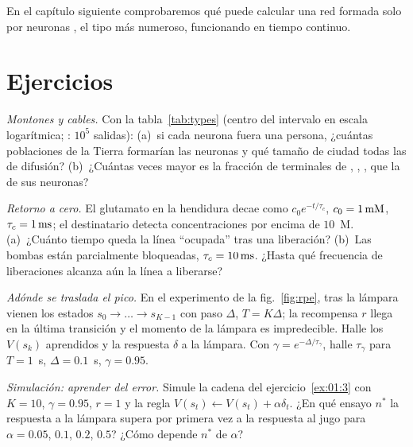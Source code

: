 En el capítulo siguiente comprobaremos qué puede calcular una red formada solo por neuronas , el tipo más numeroso, funcionando en tiempo continuo.

\section{Ejercicios}

\begin{exercise}[\lvlA]
\label{ex:01:1}
\emph{Montones y cables.} Con la tabla~\ref{tab:types} (centro del intervalo en escala logarítmica; : $10^5$ salidas): (a)~si cada neurona fuera una persona, ¿cuántas poblaciones de la Tierra formarían las neuronas  y qué tamaño de ciudad todas las de difusión? (b)~¿Cuántas veces mayor es la fracción de terminales de , , ,  que la de sus neuronas?
\end{exercise}

\begin{exercise}[\lvlA]
\label{ex:01:2}
\emph{Retorno a cero.} El glutamato en la hendidura decae como $c_0e^{-t/\tau_c}$, $c_0=1\,\text{mM}$, $\tau_c=1\,\text{ms}$; el destinatario detecta concentraciones por encima de $10$~\textmu M. (a)~¿Cuánto tiempo queda la línea “ocupada” tras una liberación? (b)~Las bombas están parcialmente bloqueadas, $\tau_c=10\,\text{ms}$. ¿Hasta qué frecuencia de liberaciones alcanza aún la línea a liberarse?
\end{exercise}

\begin{exercise}[\lvlB]
\label{ex:01:3}
\emph{Adónde se traslada el pico.} En el experimento de la fig.~\ref{fig:rpe}, tras la lámpara vienen los estados $s_0\to\dots\to s_{K-1}$ con paso $\Delta$, $T=K\Delta$; la recompensa $r$ llega en la última transición y el momento de la lámpara es impredecible. Halle los $V(s_k)$ aprendidos y la respuesta $\delta$ a la lámpara. Con $\gamma=e^{-\Delta/\tau_\gamma}$, halle $\tau_\gamma$ para $T=1$~s, $\Delta=0.1$~s, $\gamma=0.95$.
\end{exercise}

\begin{exercise}[\lvlB]
\label{ex:01:4}
\emph{Simulación: aprender del error.} Simule la cadena del ejercicio~\ref{ex:01:3} con $K=10$, $\gamma=0.95$, $r=1$ y la regla $V(s_t)\leftarrow V(s_t)+\alpha\delta_t$. ¿En qué ensayo $n^*$ la respuesta a la lámpara supera por primera vez a la respuesta al jugo para $\alpha=0.05$, $0.1$, $0.2$, $0.5$? ¿Cómo depende $n^*$ de $\alpha$?
\end{exercise}


